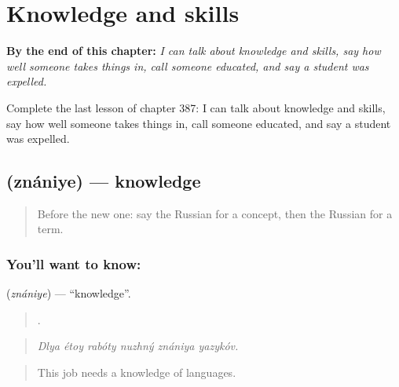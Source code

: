 
\chapter{Knowledge and skills}
\label{ch:ru-knowledge-and-skills}

\begin{chapteropening}
\textbf{By the end of this chapter:} \emph{I can talk about knowledge and skills, say how well someone takes things in, call someone educated, and say a student was expelled.}

Complete the last lesson of chapter 387: I can talk about knowledge and skills, say how well someone takes things in, call someone educated, and say a student was expelled.
\end{chapteropening}

\section[\texorpdfstring{\ru{знание} (znániye)}{знание (znániye)}]{ (znániye) — knowledge}

\label{lesson:RU-C387-znanie}



\begin{quote}
Before the new one: say the Russian for a concept, then the Russian for a term.
\end{quote}

\subsection*{You'll want to know: }
\textbf{} (\emph{znániye}) — \textquotedblleft{}knowledge\textquotedblright{}.

\begin{quote}
     .
\end{quote}

\begin{quote}
\emph{Dlya étoy rabóty nuzhný znániya yazykóv.}
\end{quote}

\begin{quote}
This job needs a knowledge of languages.
\end{quote}

